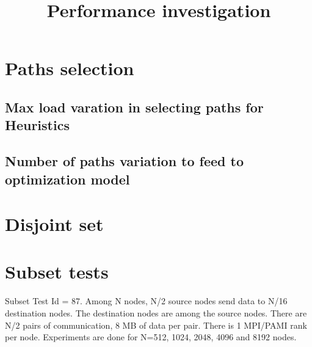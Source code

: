 \documentclass[letter]{article}
\title{Performance investigation}
\begin{document}
\maketitle

\section{Paths selection}

\subsection{Max load varation in selecting paths for Heuristics}

\subsection{Number of paths variation to feed to optimization model}

\section{Disjoint set}


\section{Subset tests}

Subset Test Id = 87. Among N nodes, N/2 source nodes send data to N/16 destination nodes. The destination nodes are among the source nodes. There are N/2 pairs of communication, 8 MB of data per pair. There is 1 MPI/PAMI rank per node. Experiments are done for N=512, 1024, 2048, 4096 and 8192 nodes.
\end{document}
